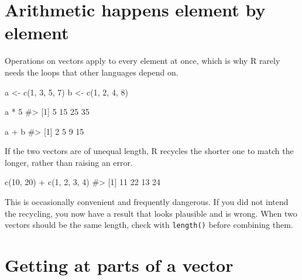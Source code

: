 \documentclass[
  a4paper,
]{scrbook}
\newenvironment{Shaded}{\begin{snugshade}}{\end{snugshade}}
\newcommand{\CommentTok}[1]{\textcolor[rgb]{0.37,0.37,0.37}{#1}}
\newcommand{\DecValTok}[1]{\textcolor[rgb]{0.68,0.00,0.00}{#1}}
\newcommand{\FunctionTok}[1]{\textcolor[rgb]{0.28,0.35,0.67}{#1}}
\newcommand{\NormalTok}[1]{\textcolor[rgb]{0.00,0.23,0.31}{#1}}
\newcommand{\OtherTok}[1]{\textcolor[rgb]{0.00,0.23,0.31}{#1}}
\newcommand{\SpecialCharTok}[1]{\textcolor[rgb]{0.37,0.37,0.37}{#1}}
\begin{document}
\section*{Arithmetic happens element by
element}\label{arithmetic-happens-element-by-element}


Operations on vectors apply to every element at once, which is why R
rarely needs the loops that other languages depend on.

\begin{Shaded}
\begin{Highlighting}[]
\NormalTok{a }\OtherTok{\textless{}{-}} \FunctionTok{c}\NormalTok{(}\DecValTok{1}\NormalTok{, }\DecValTok{3}\NormalTok{, }\DecValTok{5}\NormalTok{, }\DecValTok{7}\NormalTok{)}
\NormalTok{b }\OtherTok{\textless{}{-}} \FunctionTok{c}\NormalTok{(}\DecValTok{1}\NormalTok{, }\DecValTok{2}\NormalTok{, }\DecValTok{4}\NormalTok{, }\DecValTok{8}\NormalTok{)}

\NormalTok{a }\SpecialCharTok{*} \DecValTok{5}
\CommentTok{\#\textgreater{} [1]  5 15 25 35}

\NormalTok{a }\SpecialCharTok{+}\NormalTok{ b}
\CommentTok{\#\textgreater{} [1]  2  5  9 15}
\end{Highlighting}
\end{Shaded}

If the two vectors are of unequal length, R recycles the shorter one to
match the longer, rather than raising an error.

\begin{Shaded}
\begin{Highlighting}[]
\FunctionTok{c}\NormalTok{(}\DecValTok{10}\NormalTok{, }\DecValTok{20}\NormalTok{) }\SpecialCharTok{+} \FunctionTok{c}\NormalTok{(}\DecValTok{1}\NormalTok{, }\DecValTok{2}\NormalTok{, }\DecValTok{3}\NormalTok{, }\DecValTok{4}\NormalTok{)}
\CommentTok{\#\textgreater{} [1] 11 22 13 24}
\end{Highlighting}
\end{Shaded}

This is occasionally convenient and frequently dangerous. If you did not
intend the recycling, you now have a result that looks plausible and is
wrong. When two vectors should be the same length, check with
\texttt{length()} before combining them.

\section*{Getting at parts of a
vector}\label{getting-at-parts-of-a-vector}
\end{document}
